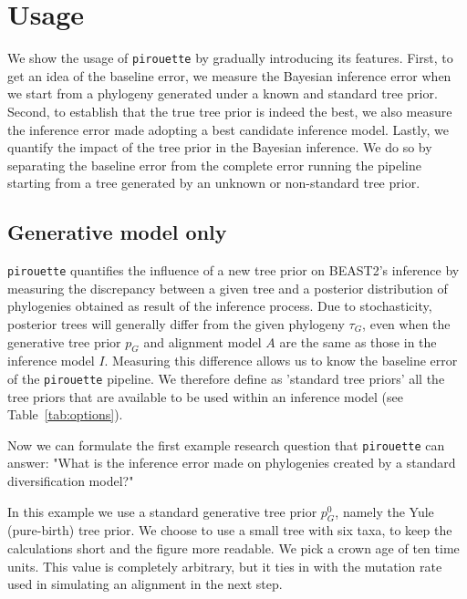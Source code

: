 \section{Usage}

We show the usage of \verb;pirouette; by gradually introducing
its features.
First, to get an idea of the baseline error, 
we measure the Bayesian inference error when we start from a phylogeny 
generated under a known and standard tree prior.
Second, to establish that the true tree prior is indeed the best, 
we also measure the inference error made adopting a
best candidate inference model.
Lastly, we quantify the impact of the tree prior in the Bayesian inference. 
We do so by separating the baseline error from the complete error 
running the pipeline starting from a tree generated by an unknown 
or non-standard tree prior.

\subsection{Generative model only}

\verb;pirouette; quantifies the influence of a new tree prior on BEAST2's 
inference by measuring the discrepancy between a given tree and a posterior 
distribution of phylogenies obtained as result of the inference process. 
Due to stochasticity, posterior trees will generally differ from the given 
phylogeny $\tau_{\mathit{G}}$, even when the generative tree 
prior $\mathit{p_{G}}$ and alignment model $\mathit{A}$ are the same as those 
in the inference model $\mathit{I}$.
Measuring this difference allows us to know the baseline error
of the \verb;pirouette; pipeline. We therefore define as 'standard tree priors' 
all the tree priors that are available to be used within an inference model (see Table~\ref{tab:options}).

Now we can formulate the first example research question that \verb;pirouette; 
can answer: "What is the inference error made on phylogenies created by a 
standard diversification model?"

In this example we use a standard generative tree prior $\mathit{p_{G}^0}$, namely the Yule (pure-birth) tree prior. 
We choose to use a small tree with six taxa, to keep
the calculations short and the figure more readable.
We pick a crown age of ten time units. This value is 
completely arbitrary, but it ties in with the mutation rate 
used in simulating an alignment in the next step.

